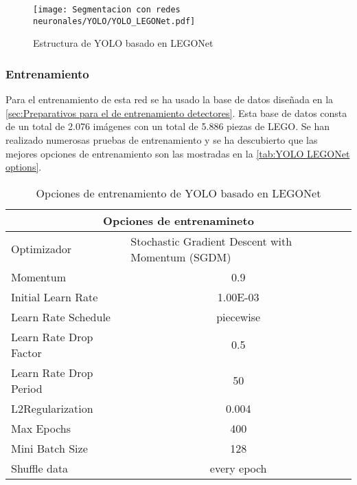 \begin{figure}[ht]  %
	\centering
	\texttt{[image: Segmentacion con redes neuronales/YOLO/YOLO\_LEGONet.pdf]}
	\caption{Estructura de YOLO basado en LEGONet}
	\label{fig:YOLO LEGONet estructrua}
\end{figure}

\subsubsection*{Entrenamiento}
Para el entrenamiento de esta red se ha usado la base de datos diseñada en la \autoref{sec:Preparativos para el de entrenamiento detectores}. Esta base de datos consta de un total de 2.076 imágenes con un total de 5.886 piezas de LEGO. Se han realizado numerosas pruebas de entrenamiento y se ha descubierto que las mejores opciones de entrenamiento son las mostradas en la \autoref{tab:YOLO LEGONet options}.

\begin{table}[ht]
  \centering
    \begin{tabular}{|l|c|}
    \hline
    \multicolumn{2}{|c|}{Opciones de entrenamineto} \\
    \hline
    Optimizador & \multicolumn{1}{l|}{Stochastic Gradient Descent with Momentum (SGDM)} \\
    \hline
    Momentum & 0.9 \\
    \hline
    Initial Learn Rate & 1.00E-03 \\
    \hline
    Learn Rate Schedule & piecewise \\
    \hline
    Learn Rate Drop Factor & 0.5 \\
    \hline
    Learn Rate Drop Period & 50 \\
    \hline
    L2Regularization & 0.004 \\
    \hline
    Max Epochs & 400 \\
    \hline
    Mini Batch Size & 128 \\
    \hline
    Shuffle data & every epoch \\
    \hline
    \end{tabular}%
  \caption{Opciones de entrenamiento de YOLO basado en LEGONet}
  \label{tab:YOLO LEGONet options}%
\end{table}%

